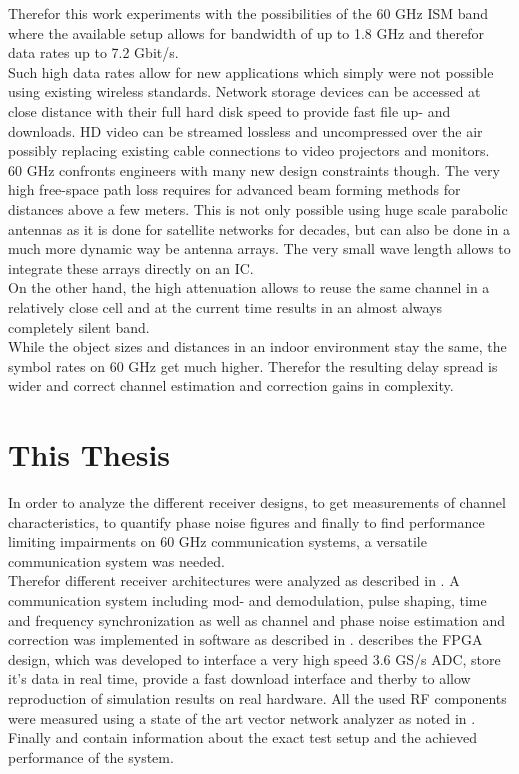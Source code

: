 Therefor this work experiments with the possibilities of the 60 GHz
\gls{ISM} band where the available setup allows for bandwidth of up to
1.8 GHz and therefor data rates up to 7.2 Gbit/s. \\

Such high data rates allow for new applications which simply were not possible
using existing wireless standards. Network storage devices can be accessed
at close distance with their full hard disk speed to provide fast file
up- and downloads. \gls{HD} video can be streamed lossless and uncompressed
over the air possibly replacing existing cable connections to video
projectors and monitors. \\

60 GHz confronts engineers with many new design constraints though. The very
high free-space path loss requires for advanced beam forming methods
for distances above a few meters.
This is not only possible using huge scale parabolic 
antennas as it is done for satellite networks for decades, but can also
be done in a much more dynamic way be antenna arrays.
The very small wave length allows to integrate these arrays
directly on an \gls{IC}. \\

On the other hand, the high attenuation allows to reuse the same channel
in a relatively close cell and at the current time results in an almost
always completely silent band. \\

While the object sizes and distances in an indoor environment stay the same,
the symbol rates on 60 GHz get much higher. Therefor the resulting
delay spread is wider and correct channel estimation and correction
gains in complexity.  \\

\section{This Thesis}
In order to analyze the different receiver designs,
to get measurements of channel characteristics,
to quantify phase noise figures and finally to find
performance limiting impairments on 60 GHz communication
systems, a versatile communication system was needed. \\

Therefor different receiver architectures were analyzed as described in
. A communication system including mod- and demodulation,
pulse shaping, time and frequency synchronization as well as channel and phase noise
estimation and correction was implemented in software as described in
.
 describes the \gls{FPGA} design, which was developed
to interface a very high speed 3.6 GS/s \gls{ADC},
store it's data in real time, provide a fast download interface and therby
to allow reproduction of simulation results on real hardware.
All the used \gls{RF} components were measured using a state of the art
vector network analyzer as noted in .
Finally  and  contain information
about the exact test setup and the achieved performance of the system. \\


